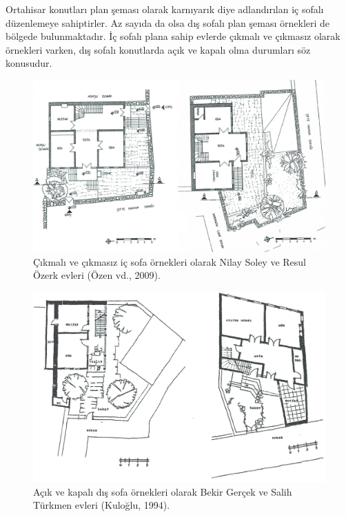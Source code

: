 \documentclass[12pt,turkish,a4paperpaper,]{report}
\begin{document}
Ortahisar konutları plan şeması olarak karnıyarık diye adlandırılan iç
sofalı düzenlemeye sahiptirler. Az sayıda da olsa dış sofalı plan şeması
örnekleri de bölgede bulunmaktadır. İç sofalı plana sahip evlerde
çıkmalı ve çıkmasız olarak örnekleri varken, dış sofalı konutlarda açık
ve kapalı olma durumları söz konusudur.

\begin{figure}
\centering
\includegraphics[width=1\textwidth,height=\textheight]{source/figures/SofaliPlanlar.jpg}
\caption{Çıkmalı ve çıkmasız iç sofa örnekleri olarak Nilay Soley ve
Resul Özerk evleri (Özen vd., 2009).}
\end{figure}

\begin{figure}
\centering
\includegraphics[width=1\textwidth,height=\textheight]{source/figures/disSofaliPlanlar.jpg}
\caption{Açık ve kapalı dış sofa örnekleri olarak Bekir Gerçek ve Salih
Türkmen evleri (Kuloğlu, 1994).}
\end{figure}
\end{document}
